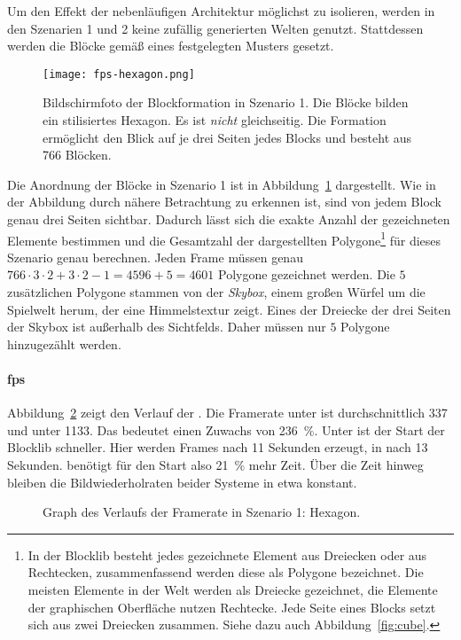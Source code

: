 
Um den Effekt der nebenläufigen Architektur möglichst zu isolieren, werden in den Szenarien 1 und 2 keine zufällig generierten Welten genutzt. Stattdessen werden die Blöcke gemäß eines festgelegten Musters gesetzt.

\begin{figure}
	\centering
	\texttt{[image: fps-hexagon.png]}
	\caption[Bildschirmfoto der Blockformation in Szenario 1 der Performanceanalyse.]{Bildschirmfoto der Blockformation in Szenario 1. Die Blöcke bilden ein stilisiertes Hexagon. Es ist \emph{nicht} gleichseitig. Die Formation ermöglicht den Blick auf je drei Seiten jedes Blocks und besteht aus 766 Blöcken.}\label{fig:hexagon}
\end{figure}
Die Anordnung der Blöcke in Szenario 1 ist in Abbildung~\ref{fig:hexagon} dargestellt. Wie in der Abbildung durch nähere Betrachtung zu erkennen ist, sind von jedem Block genau drei Seiten sichtbar. Dadurch lässt sich die exakte Anzahl der gezeichneten Elemente bestimmen und die Gesamtzahl der dargestellten Polygone\footnote{In der Blocklib besteht jedes gezeichnete Element aus Dreiecken oder aus Rechtecken, zusammenfassend werden diese als Polygone bezeichnet. Die meisten Elemente in der Welt werden als Dreiecke gezeichnet, die Elemente der graphischen Oberfläche nutzen Rechtecke. Jede Seite eines Blocks setzt sich aus zwei Dreiecken zusammen. Siehe dazu auch Abbildung~\ref{fig:cube}.} für dieses Szenario genau berechnen. Jeden Frame müssen genau $766\cdot3\cdot2 + 3\cdot2-1 = 4596 +5 = 4601$ Polygone gezeichnet werden. Die $5$ zusätzlichen Polygone stammen von der \emph{Skybox}, einem großen Würfel um die Spielwelt herum, der eine Himmelstextur zeigt. Eines der Dreiecke der drei Seiten der Skybox ist außerhalb des Sichtfelds. Daher müssen nur $5$ Polygone hinzugezählt werden.


\paragraph{\ac{fps}} Abbildung~\ref{fig:seed-0-hexagon-fps} zeigt den Verlauf der \si{\fps}. Die Framerate unter \sysA{} ist durchschnittlich \SI{337}{\fps} und unter \sysB{} \SI{1133}{\fps}. Das bedeutet einen Zuwachs von \SI{236}{\percent}. Unter \sysA{} ist der Start der Blocklib schneller. Hier werden Frames nach 11 Sekunden erzeugt, in \sysB{} nach 13 Sekunden. \sysB{} benötigt für den Start also \SI{21}{\percent} mehr Zeit. Über die Zeit hinweg bleiben die Bildwiederholraten beider Systeme in etwa konstant.
\begin{figure}[!htbp]
	\settowidth{}
	\caption{Graph des Verlaufs der Framerate in Szenario 1: Hexagon.}\label{fig:seed-0-hexagon-fps}
\end{figure}


